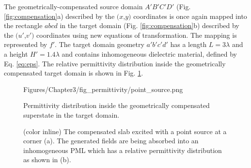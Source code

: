 %
The geometrically-compensated source domain  $A'B'C'D'$ (Fig. \ref{fig:compensation}a) described by the $(x$,$y)$ coordinates is once again mapped into the rectangle $abcd$ in the target domain (Fig. \ref{fig:compensation}b) described by the $(u'$,$v')$ coordinates using new equations of transformation. The mapping is represented by $f'$. The target domain geometry $a'b'c'd'$ has a length $L= 3 \lambda$ and a height $H' = 1.4 \lambda$ and contains inhomogeneous dielectric material, defined by Eq. \ref{eq:eps}. The relative permittivity distribution inside the geometrically compensated target domain is shown in Fig. \ref{fig:epspointsource}. %

\begin{figure} []
\centering
 	\begin{overpic}[scale=0.75]{Figures/Chapter3/fig_permittivity/point_source.png}

  \end{overpic}

  \caption[Permittivity distribution inside the geometrically compensated superstate in the target domain.]{Permittivity distribution inside the geometrically compensated superstate in the target domain.}

\label{fig:epspointsource}
\end{figure}  
  
\begin{figure} [h!]
  \centering
  \noindent
	\mbox{}
	\hspace*{\fill}%
  \mbox{}

  \caption[Field plot showing the compensated slab excited with a point source are absorbed into an inhomogeneous PML region.]{(color inline) The compensated slab excited with a point source at a corner (a). The generated fields are being absorbed into an inhomogeneous PML which has a relative permittivity distribution as shown in (b).}
\label{fig:fieldsforpointsource}
\end{figure}

